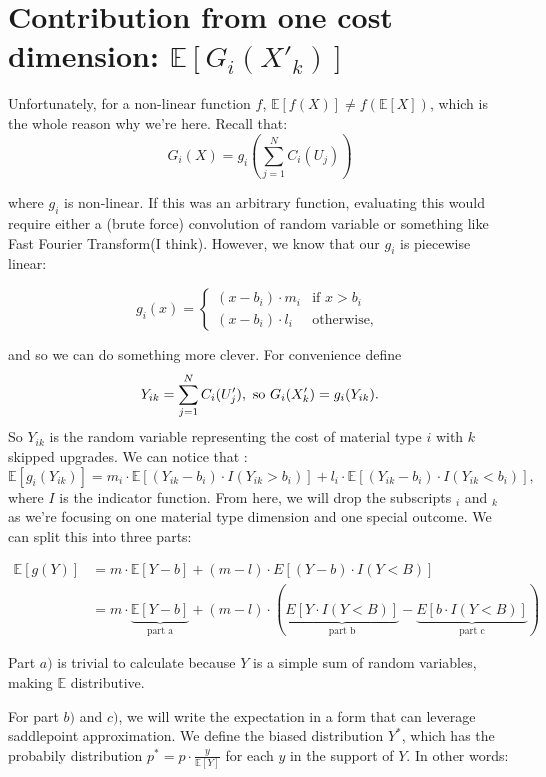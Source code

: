 \documentclass[a4paper,11pt]{article}
\begin{document}
\section{Contribution from one cost dimension: $\mathbb{E}[  G_i(X'_k) ]$}\label{one_dimension_section}

Unfortunately, for a non-linear function $f$,  $ \mathbb{E}[f(X)] \neq  f(\mathbb{E}[X])$, which is the whole reason why we're here. Recall that:
$$
G_i(X) = g_i ( \sum^N_{j=1}C_i(U_j))
$$

where $g_i$ is non-linear. If this was an arbitrary function, evaluating this would require either a (brute force) convolution of random variable or something like Fast Fourier Transform(I think). However, we know that our $g_i$ is piecewise linear:

$$
g_i(x) =  \begin{cases}
  (x - b_i) \cdot   m_i  & \text{if } x > b_i \\
     (x - b_i) \cdot   l_i& \text{otherwise, }
\end{cases}
$$

and so we can do something more clever. For convenience define
$$
Y_{ik}=\sum^N_{j=1}C_i(U'_j),\\
 \text{ so } G_i(X'_k) = g_i(Y_{ik}). \\
$$
So $Y_{ik}$ is the random variable representing the cost of material type $i$ with $k$ skipped upgrades. We can notice that :
$$
\mathbb{E}[g_i(Y_{ik})] = m_i \cdot \mathbb{E}[(Y_{ik}-b_i) \cdot I( Y_{ik} > b_i)] + l_i \cdot  \mathbb{E}[(Y_{ik}-b_i) \cdot I( Y_{ik} < b_i)],
$$
where $I$ is the indicator function. From here, we will drop the subscripts $_i$ and $_k$ as we're focusing on one material type dimension and one special outcome. We can split this into three parts:

\begin{align*}
\mathbb{E}[g(Y)] &= m \cdot \mathbb{E}[Y-b] + (m-l) \cdot E[(Y-b) \cdot I(Y<B)] \\
&= m \cdot \underbrace{\mathbb{E}[Y-b]}_{\text{part a}} + (m-l) \cdot (\underbrace{E[Y \cdot I(Y<B)]}_{\text{part b}} - \underbrace{E[b \cdot I(Y<B)]}_{\text{part c}})
\end{align*}

\noindent
Part $a)$ is trivial to calculate because $Y$ is a simple sum of random variables, making $\mathbb{E}$ distributive.

\noindent
For part $b)$ and $c)$, we will write the expectation in a form that can leverage saddlepoint approximation. We define the biased distribution $Y^*$, which has the probabily distribution $p^* = p \cdot \frac{y}{\mathbb{E}[Y]}$ for each $y$ in the support of $Y$. In other words:
\end{document}
